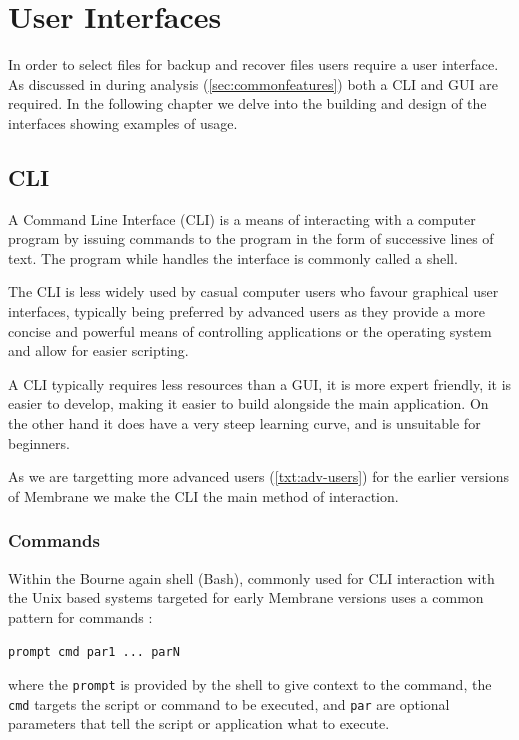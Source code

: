 \documentclass[11pt, a4paper, twocolumn, twoside]{report}
\def\code#1{\texttt{#1}}
\begin{document}
\chapter{User Interfaces}

In order to select files for backup and recover files users require a user interface. As discussed in during analysis (\ref{sec:commonfeatures}) both a CLI and GUI are required. In the following chapter we delve into the building and design of the interfaces showing examples of usage.

\section{CLI}

A Command Line Interface (CLI) is a means of interacting with a computer program by issuing commands to the program in the form of successive lines of text. The program while handles the interface is commonly called a shell.

The CLI is less widely used by casual computer users who favour graphical user interfaces, typically being preferred by advanced users as they provide a more concise and powerful means of controlling applications or the operating system and allow for easier scripting.

A CLI typically requires less resources than a GUI, it is more expert friendly, it is easier to develop, making it easier to build alongside the main application. On the other hand it does have a very steep learning curve, and is unsuitable for beginners.

As we are targetting more advanced users (\ref{txt:adv-users}) for the earlier versions of Membrane we make the CLI the main method of interaction.

\subsection{Commands}

Within the Bourne again shell (Bash), commonly used for CLI interaction with the Unix based systems targeted for early Membrane versions uses a common pattern for commands \citep{gnu2016man}:

\begin{displayquote}
 \code{prompt cmd par1 ... parN}
\end{displayquote}

where the \code{prompt} is provided by the shell to give context to the command, the \code{cmd} targets the script or command to be executed, and \code{par} are optional parameters that tell the script or application what to execute.
\end{document}

